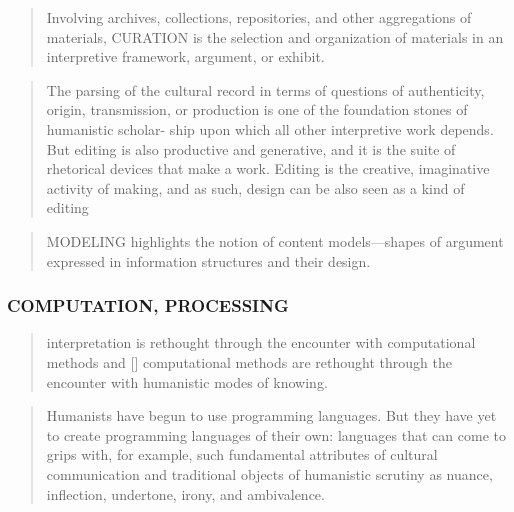 \begin{draft}
  \begin{quote}
    Involving archives, collections, repositories, and other aggregations of materials, CURATION is the selection and organization of materials in an interpretive framework, argument, or exhibit. \autocite[p.17]{Burdick2012}
  \end{quote}

  \begin{quote}
    The parsing of the cultural record in terms of questions of authenticity, origin, transmission, or production is one of the foundation stones of humanistic scholar- ship upon which all other interpretive work depends. But editing is also productive and generative, and it is the suite of rhetorical devices that make a work. Editing is the creative, imaginative activity of making, and as such, design can be also seen as a kind of editing \autocite[p.18]{Burdick2012}
  \end{quote}

  \begin{quote}
    MODELING highlights the notion of content models—shapes of argument expressed in information structures and their design. \autocite[p.18]{Burdick2012}
  \end{quote}

  \subsubsection*{COMPUTATION, PROCESSING}
  \begin{quote}
    interpretation is rethought through the encounter with computational methods and [] computational methods are rethought through the encounter with humanistic modes of knowing. \autocite[p.103]{Burdick2012}
  \end{quote}

  \begin{quote}
    Humanists have begun to use programming languages. But they have yet to create programming languages of their own: languages that can come to grips with, for example, such fundamental attributes of cultural communication and traditional objects of humanistic scrutiny as nuance, inflection, undertone, irony, and ambivalence. \autocite[p.103]{Burdick2012}
  \end{quote}


\end{draft}
